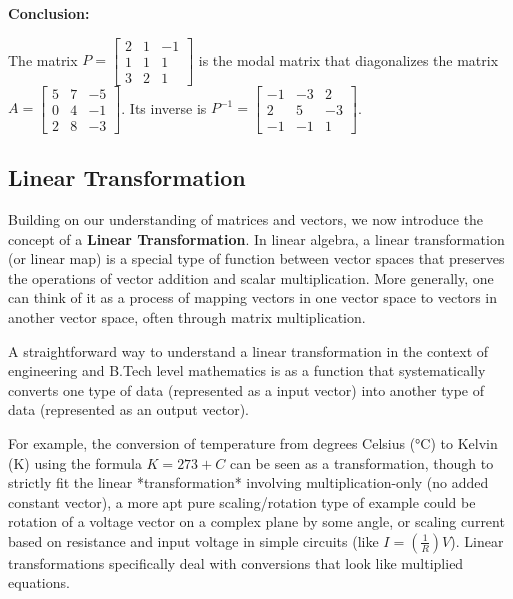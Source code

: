 \documentclass{article}
\begin{document}
\textbf{Conclusion:}

The matrix $P = \begin{bmatrix} 2 & 1 & -1 \\ 1 & 1 & 1 \\ 3 & 2 & 1 \end{bmatrix}$ is the modal matrix that diagonalizes the matrix $A = \begin{bmatrix} 5 & 7 & -5 \\ 0 & 4 & -1 \\ 2 & 8 & -3 \end{bmatrix}$. Its inverse is $P^{-1} = \begin{bmatrix} -1 & -3 & 2 \\ 2 & 5 & -3 \\ -1 & -1 & 1 \end{bmatrix}$.


\subsection{Linear Transformation} %

Building on our understanding of matrices and vectors, we now introduce the concept of a \textbf{Linear Transformation}. In linear algebra, a linear transformation (or linear map) is a special type of function between vector spaces that preserves the operations of vector addition and scalar multiplication. More generally, one can think of it as a process of mapping vectors in one vector space to vectors in another vector space, often through matrix multiplication.

A straightforward way to understand a linear transformation in the context of engineering and B.Tech level mathematics is as a function that systematically converts one type of data (represented as a input vector) into another type of data (represented as an output vector).

For example, the conversion of temperature from degrees Celsius (°C) to Kelvin (K) using the formula $K = 273 + C$ can be seen as a transformation, though to strictly fit the linear *transformation* involving multiplication-only (no added constant vector), a more apt pure scaling/rotation type of example could be rotation of a voltage vector on a complex plane by some angle, or scaling current based on resistance and input voltage in simple circuits (like $I = (\frac{1}{R})V$). Linear transformations specifically deal with conversions that look like multiplied equations.
\end{document}
